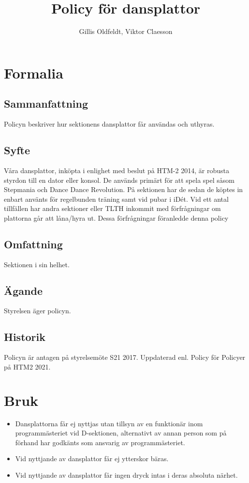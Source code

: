 \documentclass{dsekprotokoll}
\title{Policy för dansplattor}
\author{Gillis Oldfeldt, Viktor Claesson}
\begin{document}
\maketitle
\section{Formalia}
\subsection{Sammanfattning}
Policyn beskriver hur sektionens dansplattor får användas och uthyras.
\subsection{Syfte}
Våra dansplattor, inköpta i enlighet med beslut på HTM-2 2014, är robusta styrdon till en dator
eller konsol. De används primärt för att spela spel såsom Stepmania och Dance Dance Revolution. På sektionen har de sedan de köptes in enbart använts för regelbunden träning samt vid
pubar i iDét. Vid ett antal tillfällen har andra sektioner eller TLTH inkommit med förfrågningar
om plattorna går att låna/hyra ut. Dessa förfrågningar föranledde denna policy

\subsection{Omfattning}
Sektionen i sin helhet.
\subsection{Ägande}
Styrelsen äger policyn.
\subsection{Historik}
Policyn är antagen på styrelsemöte S21 2017.
Uppdaterad enl. Policy för Policyer på HTM2 2021.

\section{Bruk}
\begin{itemize}
    \item Dansplattorna får ej nyttjas utan tillsyn av en funktionär inom programmästeriet vid D-sektionen, alternativt av annan person som på förhand har godkänts som ansvarig av programmästeriet.
    \item Vid nyttjande av dansplattor får ej ytterskor bäras.
    \item Vid nyttjande av dansplattor får ingen dryck intas i deras absoluta närhet.
\end{itemize}
\end{document}
